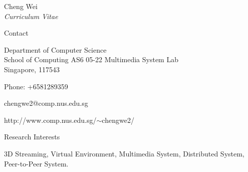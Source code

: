 \documentclass[10pt]{article}
\begin{document}


\newlength{\oldcvlabelwidth}
\renewcommand*{\cvbibname}{}

\begin{cv}{Cheng Wei\\{\large \itshape Curriculum Vitae}}

\begin{cvlist}{Contact}
	\item
	Department of Computer Science\\
	School of Computing
        AS6 05-22 Multimedia System Lab\\
        Singapore, 117543
	\item Phone: +6581289359
	\item chengwe2@comp.nus.edu.sg
	\item http://www.comp.nus.edu.sg/$\sim$chengwe2/
\end{cvlist}

\begin{cvlist}{Research Interests}
	\item 3D Streaming, Virtual Environment, 
              Multimedia System, Distributed System,
              Peer-to-Peer System.
\end{cvlist}


\end{cv}
\end{document}
